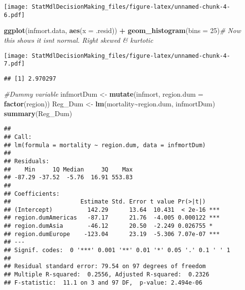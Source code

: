 \documentclass[
]{article}
\newenvironment{Shaded}{\begin{snugshade}}{\end{snugshade}}
\newcommand{\AttributeTok}[1]{\textcolor[rgb]{0.13,0.29,0.53}{#1}}
\newcommand{\CommentTok}[1]{\textcolor[rgb]{0.56,0.35,0.01}{\textit{#1}}}
\newcommand{\DecValTok}[1]{\textcolor[rgb]{0.00,0.00,0.81}{#1}}
\newcommand{\FunctionTok}[1]{\textcolor[rgb]{0.13,0.29,0.53}{\textbf{#1}}}
\newcommand{\NormalTok}[1]{#1}
\newcommand{\OtherTok}[1]{\textcolor[rgb]{0.56,0.35,0.01}{#1}}
\newcommand{\SpecialCharTok}[1]{\textcolor[rgb]{0.81,0.36,0.00}{\textbf{#1}}}
\begin{document}
\texttt{[image: StatMdlDecisionMaking\_files/figure-latex/unnamed-chunk-4-6.pdf]}

\begin{Shaded}
\begin{Highlighting}[]
     \FunctionTok{ggplot}\NormalTok{(infmort.data, }\FunctionTok{aes}\NormalTok{(}\AttributeTok{x =}\NormalTok{ .resid)) }\SpecialCharTok{+}
\FunctionTok{geom\_histogram}\NormalTok{(}\AttributeTok{bins =} \DecValTok{25}\NormalTok{)}\CommentTok{\# Now this shows it isn\textquotesingle{}t normal. Right skewed \& kurtotic}
\end{Highlighting}
\end{Shaded}

\texttt{[image: StatMdlDecisionMaking\_files/figure-latex/unnamed-chunk-4-7.pdf]}

\begin{Shaded}
\end{Shaded}

\begin{verbatim}
## [1] 2.970297
\end{verbatim}

\begin{Shaded}
\begin{Highlighting}[]
\CommentTok{\#Dummy variable  }
\NormalTok{infmortDum }\OtherTok{\textless{}{-}} \FunctionTok{mutate}\NormalTok{(infmort, }\AttributeTok{region.dum =} \FunctionTok{factor}\NormalTok{(region))}
\NormalTok{Reg\_Dum }\OtherTok{\textless{}{-}} \FunctionTok{lm}\NormalTok{(mortality}\SpecialCharTok{\textasciitilde{}}\NormalTok{region.dum, infmortDum)}
\FunctionTok{summary}\NormalTok{(Reg\_Dum)}
\end{Highlighting}
\end{Shaded}

\begin{verbatim}
## 
## Call:
## lm(formula = mortality ~ region.dum, data = infmortDum)
## 
## Residuals:
##    Min     1Q Median     3Q    Max 
## -87.29 -37.52  -5.76  16.91 553.83 
## 
## Coefficients:
##                    Estimate Std. Error t value Pr(>|t|)    
## (Intercept)          142.29      13.64  10.431  < 2e-16 ***
## region.dumAmericas   -87.17      21.76  -4.005 0.000122 ***
## region.dumAsia       -46.12      20.50  -2.249 0.026755 *  
## region.dumEurope    -123.04      23.19  -5.306 7.07e-07 ***
## ---
## Signif. codes:  0 '***' 0.001 '**' 0.01 '*' 0.05 '.' 0.1 ' ' 1
## 
## Residual standard error: 79.54 on 97 degrees of freedom
## Multiple R-squared:  0.2556, Adjusted R-squared:  0.2326 
## F-statistic:  11.1 on 3 and 97 DF,  p-value: 2.494e-06
\end{verbatim}
\end{document}
